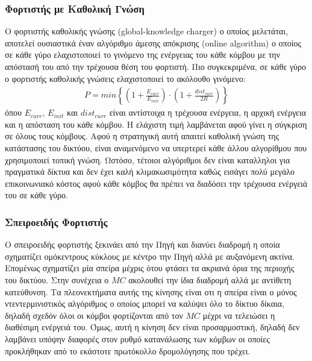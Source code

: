 \subsubsection{Φορτιστής με Καθολική Γνώση}
Ο φορτιστής καθολικής γνώσης (global-knowledge charger) ο οποίος μελετάται, αποτελεί ουσιαστικά έναν αλγόριθμο άμεσης απόκρισης (online algorithm) ο οποίος σε κάθε
γύρο ελαχιστοποιεί το γινόμενο της ενέργειας του κάθε κόμβου με την απόστασή του από την τρέχουσα θέση του φορτιστή. Πιο συγκεκριμένα, σε κάθε γύρο ο φορτιστής
καθολικής γνώσεις ελαχιστοποιεί το ακόλουθο γινόμενο:
\begin{align*}
P = min\left\{ \left(1 + \frac{E_{curr}}{E_{init}}\right) \cdot \left(1  + \frac{dist_{curr}}{2R}\right) \right\}
\end{align*}
όπου $E_{curr}$, $E_{init}$  και $dist_{curr}$ είναι αντίστοιχα η τρέχουσα ενέργεια, η αρχική ενέργεια και η απόσταση του κάθε κόμβου. Η ελάχιστη τιμή λαμβάνεται
αφού γίνει η σύγκριση σε όλους τους κόμβους. Αφού η στρατηγική αυτή απαιτεί καθολική γνώση της κατάστασης του δικτύου, είναι αναμενόμενο να υπερτερεί κάθε άλλου
αλγορίθμου που χρησιμοποιεί τοπική γνώση. Ωστόσο, τέτοιοι αλγόριθμοι δεν είναι καταλληλοι για πραγματικά δίκτυα και δεν έχει καλή κλιμακωσιμότητα καθώς εισάγει
πολύ μεγάλο επικοινωνιακό κόστος αφού κάθε κόμβος θα πρέπει να διαδόσει την τρέχουσα ενέργειά του σε κάθε γύρο.


\subsubsection{Σπειροειδής Φορτιστής}
Ο σπειροειδής φορτιστής ξεκινάει από την Πηγή και διανύει διαδρομή η οποία σχηματίζει ομόκεντρους κύκλους με κέντρο την Πηγή αλλά με αυξανόμενη ακτίνα. Επομένως
σχηματίζει μία σπείρα μέχρις ότου φτάσει τα ακριανά όρια της περιοχής του δικτύου. Στην συνέχεια  ο $MC$ ακολουθεί την ίδια διαδρομή αλλά με αντίθετη κατεύθυνση. Τα
πλεονεκτήματα αυτής της κίνησης είναι οτι η σπείρα είναι ο μόνος ντεντερμινιστικός αλγόριθμος ο οποίος μπορεί να καλύψει όλο το δίκτυο δίκαια, δηλαδή σχεδόν όλοι οι
κόμβοι φορτίζονται από τον $MC$ μέχρι να τελειώσει η διαθέσιμη ενέργειά του. Όμως, αυτή η κίνηση δεν είναι προσαρμοστική, δηλαδή δεν  λαμβάνει υπόψην διαφορές στον
ρυθμό κατανάλωσης των κόμβων οι οποίες προκλήθηκαν από το εκάστοτε πρωτόκολλο δρομολόγησης που τρέχει.

